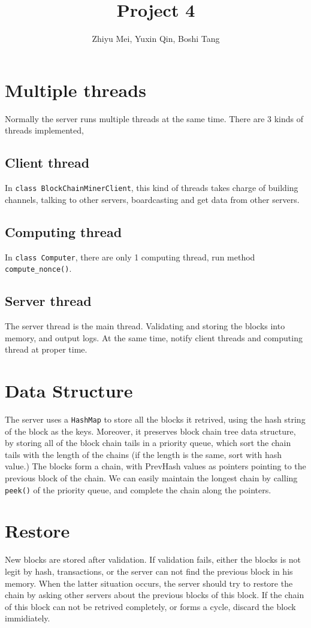 \documentclass{article}
\title{Project 4}
\author{Zhiyu Mei, Yuxin Qin, Boshi Tang}
\begin{document}
\maketitle

\section{Multiple threads}
Normally the server runs multiple threads at the same time. There are 3 kinds of threads implemented,

\subsection{Client thread}
In \texttt{class BlockChainMinerClient}, this kind of threads takes charge of building channels, talking to other servers, boardcasting and get data from other servers.

\subsection{Computing thread}
In \texttt{class Computer}, there are only 1 computing thread, run method \texttt{compute\_nonce()}.

\subsection{Server thread}
The server thread is the main thread. Validating and storing the blocks into memory, and output logs. At the same time, notify client threads and computing thread at proper time.

\section{Data Structure}
The server uses a \texttt{HashMap} to store all the blocks it retrived, using the hash string of the block as the keys. Moreover, it preserves block chain tree data structure, by storing 
all of the block chain tails in a priority queue, which sort the chain tails with the length of the chains (if the length is the same, sort with hash value.) 
The blocks form a chain, with PrevHash values as pointers pointing to the previous block of the chain. We can easily maintain the longest chain by calling 
\texttt{peek()} of the priority queue, and complete the chain along the pointers.

\section{Restore}
New blocks are stored after validation. If validation fails, either the blocks is not legit by hash, transactions, or the server can not find the previous block in his memory. 
When the latter situation occurs, the server should try to restore the chain by asking other servers about the previous blocks of this block. 
If the chain of this block can not be retrived completely, or forms a cycle, discard the block immidiately.
\end{document}
